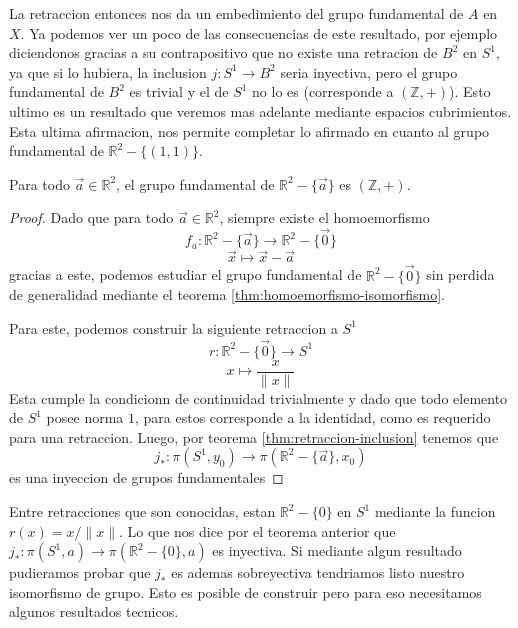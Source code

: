 La retraccion entonces nos da un embedimiento del grupo fundamental de
\( A \) en \(X\). Ya podemos ver un poco de las consecuencias de este
resultado, por ejemplo diciendonos gracias a su contrapositivo que no
existe una retracion de \(B^2\) en \(S^1\), ya que si lo hubiera, la
inclusion \(j : S^1 \to B^2\) seria inyectiva, pero el grupo fundamental
de \(B^2\) es trivial y el de \(S^1\) no lo es (corresponde a \((\mathbb
Z, +)\)). Esto ultimo es un resultado que veremos mas adelante
mediante espacios cubrimientos. Esta ultima afirmacion, nos permite
completar lo afirmado en cuanto al grupo fundamental de \(\mathbb R ^2 -
\{(1,1)\}\).

\begin{corolario}
  Para todo \(\vec a \in \mathbb R ^2\), el grupo fundamental de \(\mathbb R ^2 - \{\vec a\}\) es \((\mathbb Z, +)\).
\end{corolario}
\begin{proof}
Dado que para todo \(\vec a \in \mathbb R ^2 \), siempre existe
el homoemorfismo
\[ f_a : \mathbb R ^2 - \{\vec a\} \to \mathbb R ^2 - \{\vec 0\} \]
\[ \vec x \mapsto \vec x - \vec a \]
gracias a este, podemos estudiar el grupo fundamental de \(\mathbb R ^2
- \{\vec 0\}\) sin perdida de generalidad mediante el teorema
\ref{thm:homoemorfismo-isomorfismo}.

Para este, podemos construir la siguiente retraccion a \(S^1\)
\[ r : \mathbb R ^2 - \{\vec 0\} \to S^1 \]
\[ x \mapsto \frac x {\lVert x \rVert} \]
Esta cumple la condicionn de continuidad trivialmente y dado que todo
elemento de \(S^1\) posee norma \(1\), para estos corresponde a la
identidad, como es requerido para una retraccion. Luego, por teorema
\ref{thm:retraccion-inclusion} tenemos que
\[ j_* : \pi (S^1 , y_0) \to \pi (\mathbb R ^2 - \{\vec a\}, x_0) \]
es una inyeccion de grupos fundamentales

\end{proof}

Entre retracciones que son conocidas, estan \(\mathbb R ^2 - \{0\}\) en
\(S^1\) mediante la funcion \(r (x) = x / \lVert x \rVert \). Lo que nos
dice por el teorema anterior que \(j_{*} : \pi (S^1, a) \to \pi (\mathbb
R ^2 - \{0\}, a)\) es inyectiva. Si mediante algun resultado pudieramos
probar que \(j_{*}\) es ademas sobreyectiva tendriamos listo nuestro
isomorfismo de grupo. Esto es posible de construir pero para eso
necesitamos algunos resultados tecnicos.

